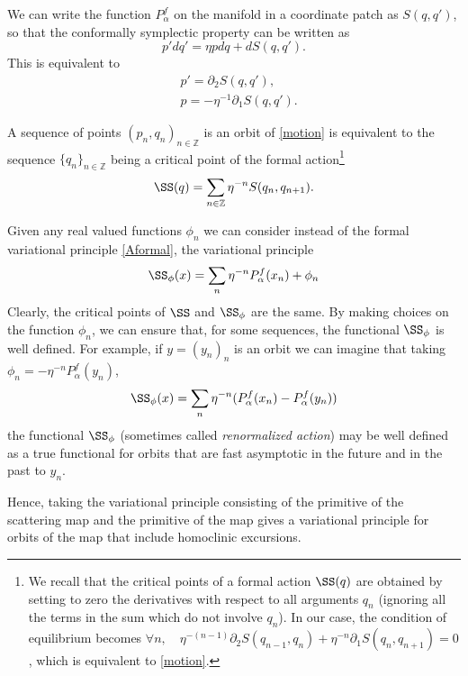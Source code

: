 \documentclass[11pt]{amsart}
\theoremstyle{definition}
\theoremstyle{remark}
\numberwithin{equation}{section}
\newcommand{\Z}{\mathbb Z}
\begin{document}
We can write the function $P^f_\alpha$ on the manifold  in
a coordinate patch as $S(q,q')$, so
that the conformally symplectic property
can be written as
\[
p' dq' = \eta p dq + dS(q,q') .
\]
This is equivalent to
\begin{equation} \label{motion}
\begin{split}
  & p' =  \partial_2 S(q, q') , \\
  &  p =  - \eta^{-1}  \partial_1 S(q,q') .
\end{split}
\end{equation}

A sequence of points $(p_n,q_n)_{n \in \Z}$
is an orbit of  \eqref{motion} is equivalent
to the sequence $\{q_n\}_{n \in \Z}$
being a critical point of the
formal action\footnote{We recall that the critical points of
a formal action $\SS(q)$ are obtained by setting to
zero  the derivatives with respect to all arguments $q_n$ (ignoring
all the terms in the sum which do not involve $q_n$).
In our case,
the condition of equilibrium
becomes $\forall n,\quad \eta^{-(n-1)} \partial_2 S(q_{n-1}, q_n)+\eta^{-n} \partial_1 S(q_n, q_{n+1}) = 0$,
which is equivalent to \eqref{motion}.
}
\[
\SS(q) = \sum_{n \in \Z}
\eta^{-n} S(q_n, q_{n+1}).
\]




Given any real valued functions $\phi_n$
we can consider instead of the formal variational principle
\eqref{Aformal}, the variational principle
\[
\SS_\phi (x) = \sum_n \eta^{-n} P^f_\alpha(x_n) + \phi_n
\]
Clearly, the critical points of $\SS$ and $\SS_\phi$
are the same.
By making choices on the function $\phi_n$,
we can ensure that, for some sequences, the functional $\SS_\phi$
is well defined. For example, if $y=(y_n)_n$ is an orbit
we can imagine that taking $\phi_n  = -\eta^{-n} P^f_\alpha(y_n)$,
\begin{equation}\label{Arenormalized}
\SS_\phi (x) = \sum_n \eta^{-n}(  P^f_\alpha(x_n) -  P^f_\alpha(y_n) )
\end{equation}
the functional $\SS_\phi$
(sometimes called \emph{renormalized action})
may be well defined as a true functional for orbits that are fast
asymptotic in the future and in the past to $y_n$.


Hence, taking the variational principle consisting of the
primitive of the scattering map and the primitive of the map
gives a variational principle for orbits of the map that include
homoclinic excursions.
\end{document}
